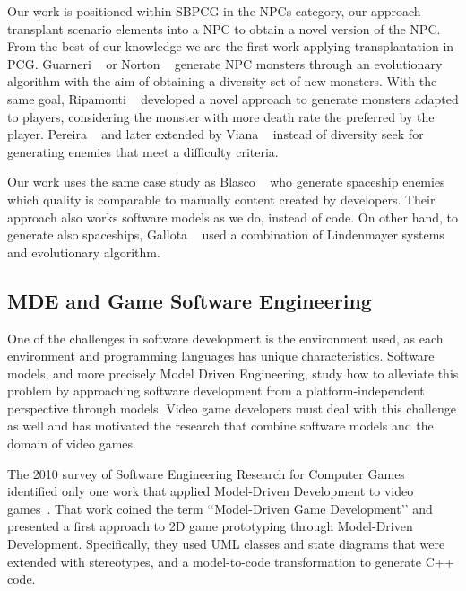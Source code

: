 Our work is positioned within SBPCG in the NPCs category, our approach transplant scenario elements into a NPC to obtain a novel version of the NPC. From the best of our knowledge we are the first work applying transplantation in PCG. Guarneri \etal~\cite{guarneri2013golem} or Norton \etal~\cite{norton2017monsters}  generate NPC monsters through an evolutionary algorithm with the aim of obtaining a diversity set of new monsters. With the same goal, Ripamonti \etal~\cite{ripamonti2021dragon} developed a novel approach to generate monsters adapted to players, considering the monster with more death rate the preferred by the player.
Pereira \etal~\cite{pereira2021procedural_enemies} and later extended by Viana \etal~\cite{viana2022illuminating} instead of diversity seek for generating enemies that meet a difficulty criteria.

Our work uses the same case study as Blasco \etal~\cite{blasco2021evolutionary} who generate spaceship enemies which quality is comparable to manually content created by developers. Their approach also works software models as we do, instead of code. On other hand, to generate also spaceships, Gallota \etal~\cite{gallotta2022evolving} used a combination of Lindenmayer systems~\cite{lindenmayer1968mathematical} and evolutionary algorithm.

\subsection{MDE and Game Software Engineering}

One of the challenges in software development is the environment used, as each environment and programming languages has unique characteristics. Software models, and more precisely Model Driven Engineering, study how to alleviate this problem by approaching software development from a platform-independent perspective through models. Video game developers must deal with this challenge as well and has motivated the research that combine software models and the domain of video games. 

The 2010 survey of Software Engineering Research for Computer Games~\cite{ampatzoglou2010software} identified only one work that applied Model-Driven Development to video games~\cite{reyno2009automatic}. That work coined the term ‘‘Model-Driven Game Development’’ and presented a first approach to 2D game prototyping through Model-Driven Development. Specifically, they used UML classes and state diagrams that were extended with stereotypes, and a model-to-code transformation to generate C++ code.

